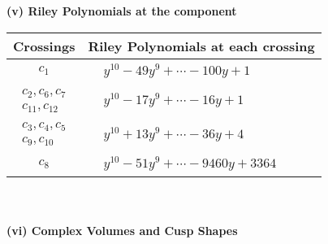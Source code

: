 \documentclass[1p]{elsarticle_modified}
\theoremstyle{definition}
\begin{document}
\newpage\renewcommand{\arraystretch}{1}
\flushleft \textbf{(v) Riley Polynomials at the component}\newline \\
\begin{tabular}{m{50pt}|m{274pt}}
Crossings & \hspace{64pt}Riley Polynomials at each crossing \\
\hline $$\begin{aligned}c_{1}\end{aligned}$$&$\begin{aligned}
&y^{10}-49 y^9+\cdots-100 y+1
\end{aligned}$\\
\hline $$\begin{aligned}c_{2},c_{6},c_{7}\\c_{11},c_{12}\end{aligned}$$&$\begin{aligned}
&y^{10}-17 y^9+\cdots-16 y+1
\end{aligned}$\\
\hline $$\begin{aligned}c_{3},c_{4},c_{5}\\c_{9},c_{10}\end{aligned}$$&$\begin{aligned}
&y^{10}+13 y^9+\cdots-36 y+4
\end{aligned}$\\
\hline $$\begin{aligned}c_{8}\end{aligned}$$&$\begin{aligned}
&y^{10}-51 y^9+\cdots-9460 y+3364
\end{aligned}$\\
\hline
\end{tabular}\\~\\
\newpage\flushleft \textbf{(vi) Complex Volumes and Cusp Shapes}
\end{document}
